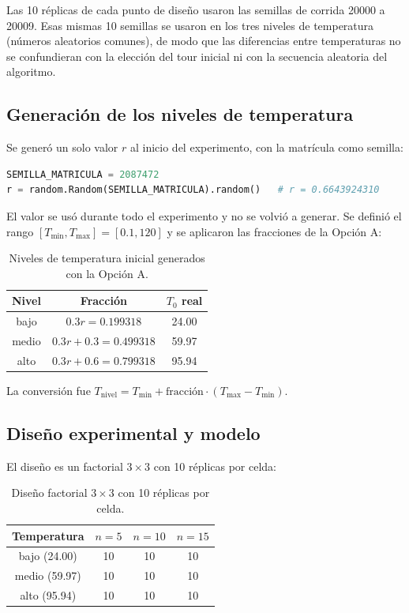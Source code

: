 \documentclass[11pt,letterpaper]{article}
\begin{document}
Las 10 réplicas de cada punto de diseño usaron las semillas de corrida
20000 a 20009. Esas mismas 10 semillas se usaron en los tres niveles de
temperatura (números aleatorios comunes), de modo que las diferencias entre
temperaturas no se confundieran con la elección del tour inicial ni con la
secuencia aleatoria del algoritmo.

\subsection{Generación de los niveles de temperatura}

Se generó un solo valor $r$ al inicio del experimento, con la matrícula como
semilla:

\begin{lstlisting}[language=Python]
SEMILLA_MATRICULA = 2087472
r = random.Random(SEMILLA_MATRICULA).random()   # r = 0.6643924310
\end{lstlisting}

El valor se usó durante todo el experimento y no se volvió a generar. Se
definió el rango $[T_{\min}, T_{\max}] = [0.1, 120]$ y se aplicaron las
fracciones de la Opción A:

\begin{table}[H]
  \centering
  \caption{Niveles de temperatura inicial generados con la Opción A.}
  \label{tab:niveles}
  \renewcommand{\arraystretch}{1.15}
  \begin{tabular}{@{}ccc@{}}
    \toprule
    Nivel & Fracción & $T_0$ real \\
    \midrule
    bajo  & $0.3r = 0.199318$        & 24.00 \\
    medio & $0.3r + 0.3 = 0.499318$  & 59.97 \\
    alto  & $0.3r + 0.6 = 0.799318$  & 95.94 \\
    \bottomrule
  \end{tabular}
\end{table}

La conversión fue $T_{\text{nivel}} = T_{\min} + \text{fracción} \cdot
(T_{\max} - T_{\min})$.

\subsection{Diseño experimental y modelo}

El diseño es un factorial $3 \times 3$ con 10 réplicas por celda:

\begin{table}[H]
  \centering
  \caption{Diseño factorial $3 \times 3$ con 10 réplicas por celda.}
  \label{tab:diseno}
  \renewcommand{\arraystretch}{1.15}
  \begin{tabular}{@{}cccc@{}}
    \toprule
    Temperatura & $n = 5$ & $n = 10$ & $n = 15$ \\
    \midrule
    bajo (24.00)  & 10 & 10 & 10 \\
    medio (59.97) & 10 & 10 & 10 \\
    alto (95.94)  & 10 & 10 & 10 \\
    \bottomrule
  \end{tabular}
\end{table}
\end{document}
